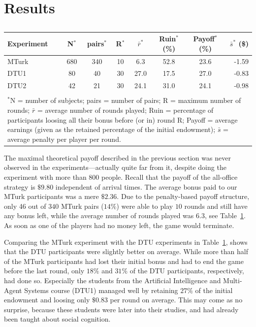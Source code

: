 \documentclass[twocolumn,a4paper,superscriptaddress,nofootinbib]{revtex4}
\begin{document}
\section{Results}
\label{S:results}
\begin{table}%
\caption{} %

\smallskip
\centering
\setlength{\arrayrulewidth}{1pt}
\begin{tabular}{l|ccccccr}
\hline
Experiment   		&   N$^*$ 	&   pairs$^*$ & R$^*$ 	&  $\bar r^*$ & Ruin$^*$ (\%) 	& Payoff$^*$ (\%)	&  $\bar s^*$ (\$) \\
\hline
 MTurk      & 680 	&	340	& 	10 	& 6.3 		 & 52.8 		& 23.6			& -1.59 \\
 DTU1       &  80 	& 	40	&	30 	& 27.0		 & 17.5		& 27.0			& -0.83 \\
 DTU2       &  42 	& 	21	&	30 	& 24.1		 & 31.0 		& 24.1			& -0.98 \\
\hline  \multicolumn{7}{c}{} \\[-2mm]
\multicolumn{8}{p{12cm}}{$^*$N = number of subjects; pairs = number of pairs; R = maximum number of rounds; $\bar r$ = average number of rounds played; Ruin = percentage of participants loosing all their bonus before (or in) round R; Payoff = average earnings (given as the retained percentage of the initial endowment); $\bar s$ = average penalty per player per round.} \\
\end{tabular}
\label{table:1}
\end{table}
The maximal theoretical payoff described in the previous section was never observed in the experiments---actually quite far from it, despite doing the experiment with more than $800$ people. Recall that the payoff of the all-office strategy is $\$9.80$ independent of arrival times. The average bonus paid to our MTurk participants was a mere $\$2.36$. Due to the penalty-based payoff structure, only 46 out of $340$ MTurk pairs ($14\%$) were able to play $10$ rounds and still have any bonus left, while the average number of rounds played was $6.3$, see Table~\ref{table:1}. As soon as one of the players had no money left, the game would terminate.

Comparing the MTurk experiment with the DTU experiments in Table~\ref{table:1}, shows that the DTU participants were slightly better on average. While more than half of the MTurk participants had lost their initial bonus and had to end the game before the last round, only $18\%$ and $31\%$ of the DTU participants, respectively, had done so. Especially the students from the Artificial Intelligence and Multi-Agent Systems course (DTU1) managed well by retaining $27\%$ of the initial endowment and loosing only $\$0.83$ per round on average. This may come as no surprise, because these students were later into their studies, and had already been taught about social cognition.
\end{document}
